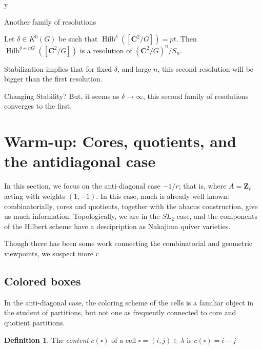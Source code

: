 y\documentclass{amsart}[12pt]
\theoremstyle{definition}
\newtheorem{definition}[dummy]{Definition}
\newcommand{\Z}{\mathbf{Z}}
\newcommand{\C}{\mathbf{C}}
\DeclareMathOperator{\Hilb}{Hilb}
\begin{document}
Another family of resolutions

Let $\delta\in K^0(G)$ be such that $\Hilb^\delta([\C^2/G])=pt$.  Then $\Hilb^{\delta+nG}([\C^2/G])$ is a resolution of $(\C^2/G)^n/S_n$.  



Stabilization implies that for fixed $\delta$, and large $n$, this second resolution will be bigger than the first resolution.

Changing Stability?
But, it seems as $\delta\to\infty$, this second family of resolutions converges to the first.


\section{Warm-up: Cores, quotients, and the antidiagonal case}

In this section, we focus on the anti-diagonal case $-1/r$; that is, where $A=\Z_r$ acting with weights $(1,-1)$.  In this case, much is already well known: combinatorially, cores and quotients, together with the abacus construction, give us much information.  Topologically, we are in the $SL_2$ case, and the components of the Hilbert scheme have a descipription as Nakajima quiver varieties. 

Though there has been some work connecting the combinatorial and geometric viewpoints, we suspect more c

\subsection{Colored boxes}

In the anti-diagonal case, the coloring scheme of the cells is a familiar object in the student of partitions, but not one as frequently connected to core and quotient partitions.

\begin{definition}
The \emph{content} $c(\square)$ of a cell $\square=(i,j)\in\lambda$ is $c(\square)=i-j$
\end{definition}

\end{document}
